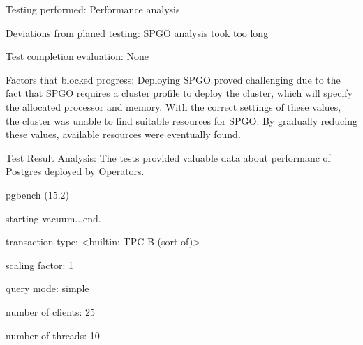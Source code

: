 
Testing performed: Performance analysis

Deviations from planed testing: SPGO analysis took too long

Test completion evaluation: None

Factors that blocked progress: Deploying SPGO proved challenging due to the fact that SPGO requires a cluster profile to deploy the cluster, which will specify the allocated processor and memory. With the correct settings of these values, the cluster was unable to find suitable resources for SPGO. By gradually reducing these values, available resources were eventually found.

Test Result Analysis: The tests provided valuable data about performanc of Postgres deployed by Operators.

pgbench (15.2)

starting vacuum...end.

transaction type: <builtin: TPC-B (sort of)>

scaling factor: 1

query mode: simple

number of clients: 25

number of threads: 10

